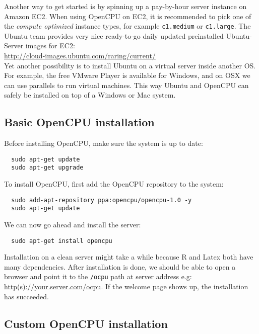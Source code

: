 \documentclass{scrartcl}\usepackage[]{graphicx}\usepackage[]{color}
\begin{document}
\noindent Another way to get started is by spinning up a pay-by-hour server instance on Amazon EC2. When using OpenCPU on EC2, it is recommended to pick one of the \emph{compute optimized} instance types, for example \texttt{c1.medium} or \texttt{c1.large}. The Ubuntu team provides very nice ready-to-go daily updated preinstalled Ubuntu-Server images for EC2:\\

\url{http://cloud-images.ubuntu.com/raring/current/} \\

\noindent Yet another possibility is to install Ubuntu on a virtual server inside another OS. For example, the free VMware Player is available for Windows, and on OSX we can use parallels to run virtual machines. This way Ubuntu and OpenCPU can safely be installed on top of a Windows or Mac system. \\

\subsection{Basic OpenCPU installation}

Before installing OpenCPU, make sure the system is up to date:

\begin{verbatim}
  sudo apt-get update
  sudo apt-get upgrade
\end{verbatim}
To install OpenCPU, first add the OpenCPU repository to the system:

\begin{verbatim}
  sudo add-apt-repository ppa:opencpu/opencpu-1.0 -y
  sudo apt-get update
\end{verbatim}
We can now go ahead and install the server:

\begin{verbatim}
  sudo apt-get install opencpu
\end{verbatim}
Installation on a clean server might take a while because R and Latex both have many dependencies. After installation is done, we should be able to open a browser and point it to the \texttt{/ocpu} path at server address e.g: \href{http://your.server.com/ocpu}{http(s)://your.server.com/ocpu}. If the welcome page shows up, the installation has succeeded. 

\subsection{Custom OpenCPU installation}
\end{document}
